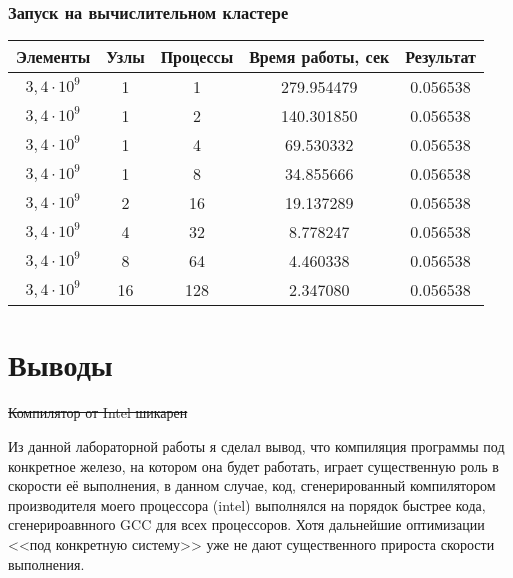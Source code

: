 \documentclass[a4paper,12pt]{article}
\begin{document}
\subsubsection{Запуск на вычислительном кластере}
\begin{tabular}{c | c c | c | c}
\textbf{Элементы} & \textbf{Узлы} & \textbf{Процессы} & \textbf{Время работы, сек} & \textbf{Результат}\\
\hline
$3,4\cdot 10^9$ & 1 & 1 & 279.954479 & 0.056538\\
$3,4\cdot 10^9$ & 1 & 2 & 140.301850 & 0.056538\\
$3,4\cdot 10^9$ & 1 & 4 & 69.530332 & 0.056538\\
$3,4\cdot 10^9$ & 1 & 8 & 34.855666 & 0.056538\\
$3,4\cdot 10^9$ & 2 & 16 & 19.137289 & 0.056538\\
$3,4\cdot 10^9$ & 4 & 32 & 8.778247 & 0.056538\\
$3,4\cdot 10^9$ & 8 & 64 & 4.460338 & 0.056538\\
$3,4\cdot 10^9$ & 16 & 128 & 2.347080 & 0.056538\\
\hline
\end{tabular}


\newpage
\section{Выводы}
\sout{Компилятор от Intel шикарен}

Из данной лабораторной работы я сделал вывод, что компиляция программы под конкретное железо, на котором она будет работать, играет существенную роль в скорости её выполнения, в данном случае, код, сгенерированный компилятором производителя моего процессора (intel) выполнялся на порядок быстрее кода, сгенерироавнного GCC для всех процессоров. Хотя дальнейшие оптимизации <<под конкретную систему>> уже не дают существенного прироста скорости выполнения.
\end{document}
